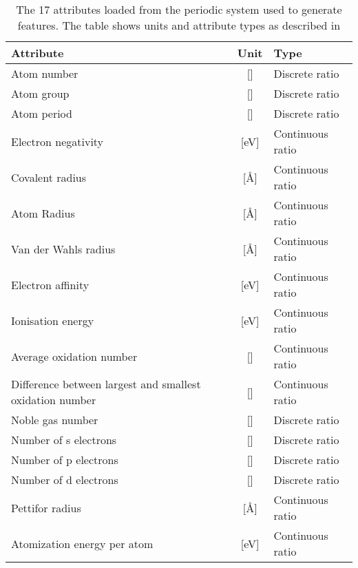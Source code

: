 \begin{table}[ht]
    \centering
    \begin{tabular}{|p{5cm}|c|l|}\hline
        \textbf{Attribute}                 & \textbf{Unit}  &\textbf{Type}  \\ \hline
        Atom number                 & []    &  Discrete ratio \\ \hline
        Atom group                  & []    &  Discrete ratio \\ \hline
        Atom period                 & []    &  Discrete ratio \\ \hline
        Electron negativity         & [eV]  &  Continuous ratio\\ \hline   
        Covalent radius             & [Å]   &  Continuous ratio \\ \hline
        Atom Radius                 & [Å]   &  Continuous ratio \\ \hline
        Van der Wahls radius        & [Å]   &  Continuous ratio \\ \hline
        Electron affinity           & [eV]  &  Continuous ratio \\ \hline
        Ionisation energy           & [eV]  &  Continuous ratio\\ \hline
        Average oxidation number    & []    &  Continuous ratio\\ \hline 
        Difference between largest and smallest oxidation number & [] & Continuous ratio \\ \hline
        Noble gas number      & []  & Discrete ratio  \\ \hline
        Number of s electrons & []  & Discrete ratio \\ \hline
        Number of p electrons & []  & Discrete ratio \\ \hline
        Number of d electrons & []  & Discrete ratio \\ \hline
        Pettifor radius      & [Å] & Continuous ratio \\ \hline
        Atomization energy per atom  & [eV] & Continuous ratio\\ \hline
    \end{tabular}
    \caption[Overview of the attributes used to describe an atom.]{The 17 attributes loaded from the periodic system used to generate features. The table shows units and attribute types as described in }
    \label{tab:att}
\end{table}

